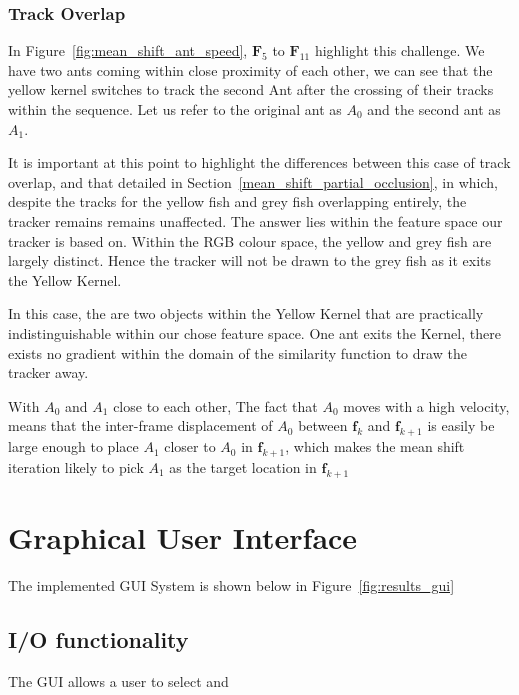 \subsubsection{Track Overlap}\label{mean_shift_track_overlap}
In Figure~\ref{fig:mean_shift_ant_speed}, $\mathbf{F}_5$ to $\mathbf{F}_{11}$
highlight this challenge. We have two ants coming within close proximity of
each other, we can see that the yellow kernel switches to track the second Ant
after the crossing of their tracks within the sequence. Let us refer to the
original ant as $A_0$ and the second ant as $A_1$. 

It is important at this point to highlight the differences between this case of
track overlap, and that detailed in Section~\ref{mean_shift_partial_occlusion},
in which, despite the tracks for the yellow fish and grey fish overlapping
entirely, the tracker remains remains unaffected.
The answer lies within the feature space our tracker is based on. Within the RGB colour space,
the yellow and grey fish are largely distinct. Hence the tracker will not be
drawn to the grey fish as it exits the Yellow Kernel.

In this case, the are two objects within the Yellow Kernel that are practically
indistinguishable within our chose feature space. One ant exits the Kernel, there exists
no gradient within the domain of the similarity function to draw the tracker away.

With $A_0$ and $A_1$ close to each other, The fact that $A_0$ moves with a high
velocity, means that the inter-frame displacement of $A_0$ between
$\mathbf{f}_k$ and $\mathbf{f}_{k+1}$ is easily be large enough to place $A_1$
closer to $A_0$ in $\mathbf{f}_{k+1}$, which makes the mean shift iteration
likely to pick $A_1$ as the target location in $\mathbf{f}_{k+1}$

\section{Graphical User Interface}
The implemented GUI System is shown below in Figure~\ref{fig:results_gui}


\subsection{I/O functionality}
The GUI allows a user to select and 

